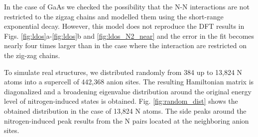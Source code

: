 \documentclass[aps,prb,10pt,twocolumn,groupedaddress]{revtex4-1}
\begin{document}
In the case of GaAs we checked the possibility that the N-N interactions are
not restricted to the zigzag chains and modelled them using the short-range
exponential decay. However, this model does not reproduce
the DFT results in Figs. \ref{fig:ldos}a-\ref{fig:ldos}b and 
\ref{fig:ldos_N2_near} and the error in the fit becomes nearly four times 
larger than in the case where the interaction are restricted on the zig-zag 
chains.

To simulate real structures, we distributed randomly from 384 up to 13,824 N 
atoms into a supercell of 442,368 anion sites. The resulting Hamiltonian matrix 
is diagonalized and a broadening eigenvalue distribution around the original 
energy level of nitrogen-induced states is obtained. 
Fig. \ref{fig:random_dist} shows the obtained 
distribution in the case of 13,824 N atoms. The side peaks around the 
nitrogen-induced peak results from the N pairs located at the 
neighboring anion sites.


\end{document}
